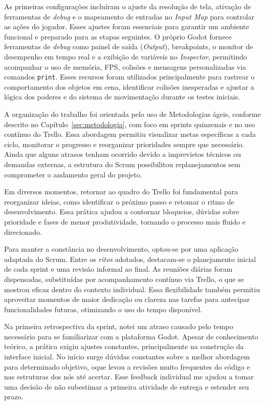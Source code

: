 As primeiras configurações incluíram o ajuste da resolução de tela, ativação de ferramentas de \textit{debug} e o mapeamento de entradas no \textit{Input Map} para controlar as ações do jogador. Esses ajustes foram essenciais para garantir um ambiente funcional e preparado para as etapas seguintes. O próprio Godot fornece ferramentas de \textit{debug} como painel de saída (\textit{Output}), breakpoints, o monitor de desempenho em tempo real e a exibição de variáveis no \textit{Inspector}, permitindo acompanhar o uso de memória, FPS, colisões e mensagens personalizadas via comandos \texttt{print}. Esses recursos foram utilizados principalmente para rastrear o comportamento dos objetos em cena, identificar colisões inesperadas e ajustar a lógica dos poderes e do sistema de movimentação durante os testes iniciais.

A organização do trabalho foi orientada pelo uso de Metodologias ágeis, conforme descrito no Capítulo~\ref{sec:metodologia}, com foco em sprints quinzenais e no uso contínuo do Trello. Essa abordagem permitiu visualizar metas específicas a cada ciclo, monitorar o progresso e reorganizar prioridades sempre que necessário. Ainda que alguns atrasos tenham ocorrido devido a imprevistos técnicos ou demandas externas, a estrutura do Scrum possibilitou replanejamentos sem comprometer o andamento geral do projeto.

Em diversos momentos, retornar ao quadro do Trello foi fundamental para reorganizar ideias, como identificar o próximo passo e retomar o ritmo de desenvolvimento. Essa prática ajudou a contornar bloqueios, dúvidas sobre prioridade e fases de menor produtividade, tornando o processo mais fluido e direcionado.

Para manter a constância no desenvolvimento, optou-se por uma aplicação adaptada do Scrum. Entre os \textit{ritos} adotados, destacam-se o planejamento inicial de cada sprint e uma revisão informal ao final. As reuniões diárias foram dispensadas, substituídas por acompanhamento contínuo via Trello, o que se mostrou eficaz dentro do contexto individual. Essa flexibilidade também permitiu aproveitar momentos de maior dedicação ou clareza nas tarefas para antecipar funcionalidades futuras, otimizando o uso do tempo disponível.

Na primeira retrospectiva da sprint, notei um atraso causado pelo tempo necessário para se familiarizar com a plataforma Godot. Apesar de conhecimento teórico, a prática exigiu ajustes constantes, principalmente na construção da interface inicial. No início surge dúvidas constantes sobre a melhor abordagem para determinado objetivo, oque levou a revisões muito frequentes do código e nas estruturas dos nós até acertar. Esse feedback individual me ajudou a tomar uma decisão de não subestimar a primeira atividade de entrega e estender seu prazo.

